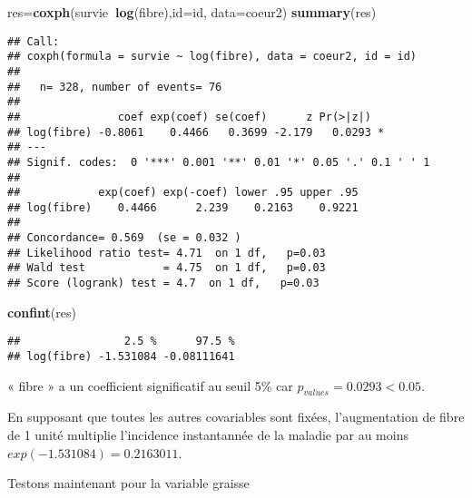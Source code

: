 \documentclass[
]{article}
\newenvironment{Shaded}{\begin{snugshade}}{\end{snugshade}}
\newcommand{\DataTypeTok}[1]{\textcolor[rgb]{0.13,0.29,0.53}{#1}}
\newcommand{\KeywordTok}[1]{\textcolor[rgb]{0.13,0.29,0.53}{\textbf{#1}}}
\newcommand{\NormalTok}[1]{#1}
\newcommand{\OperatorTok}[1]{\textcolor[rgb]{0.81,0.36,0.00}{\textbf{#1}}}
\begin{document}
\begin{Shaded}
\begin{Highlighting}[]
\NormalTok{res=}\KeywordTok{coxph}\NormalTok{(survie}\OperatorTok{~}\KeywordTok{log}\NormalTok{(fibre),}\DataTypeTok{id=}\NormalTok{id, }\DataTypeTok{data=}\NormalTok{coeur2)}
\KeywordTok{summary}\NormalTok{(res)}
\end{Highlighting}
\end{Shaded}

\begin{verbatim}
## Call:
## coxph(formula = survie ~ log(fibre), data = coeur2, id = id)
## 
##   n= 328, number of events= 76 
## 
##               coef exp(coef) se(coef)      z Pr(>|z|)  
## log(fibre) -0.8061    0.4466   0.3699 -2.179   0.0293 *
## ---
## Signif. codes:  0 '***' 0.001 '**' 0.01 '*' 0.05 '.' 0.1 ' ' 1
## 
##            exp(coef) exp(-coef) lower .95 upper .95
## log(fibre)    0.4466      2.239    0.2163    0.9221
## 
## Concordance= 0.569  (se = 0.032 )
## Likelihood ratio test= 4.71  on 1 df,   p=0.03
## Wald test            = 4.75  on 1 df,   p=0.03
## Score (logrank) test = 4.7  on 1 df,   p=0.03
\end{verbatim}

\begin{Shaded}
\begin{Highlighting}[]
\KeywordTok{confint}\NormalTok{(res)}
\end{Highlighting}
\end{Shaded}

\begin{verbatim}
##                2.5 %      97.5 %
## log(fibre) -1.531084 -0.08111641
\end{verbatim}

« fibre » a un coefficient significatif au seuil 5\% car
\(p_{values} =0.0293 < 0.05\).

En supposant que toutes les autres covariables sont fixées,
l'augmentation de fibre de 1 unité multiplie l'incidence instantannée de
la maladie par au moins \(exp(-1.531084)=0.2163011\).

Testons maintenant pour la variable graisse

\begin{Shaded}
\end{Shaded}
\end{document}
